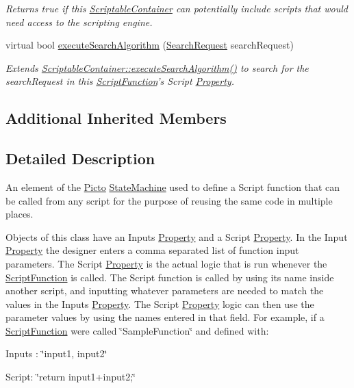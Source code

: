 \begin{DoxyCompactItemize}
\begin{DoxyCompactList}\small\item\em Returns true if this \hyperlink{class_picto_1_1_scriptable_container}{Scriptable\-Container} can potentially include scripts that would need access to the scripting engine. \end{DoxyCompactList}\item 
\hypertarget{class_picto_1_1_script_function_afcc5b2f699914d81ead2b54003bc4a85}{virtual bool \hyperlink{class_picto_1_1_script_function_afcc5b2f699914d81ead2b54003bc4a85}{execute\-Search\-Algorithm} (\hyperlink{struct_search_request}{Search\-Request} search\-Request)}\label{class_picto_1_1_script_function_afcc5b2f699914d81ead2b54003bc4a85}

\begin{DoxyCompactList}\small\item\em Extends \hyperlink{class_picto_1_1_scriptable_container_aae46c50e128e021f5ad66cb8b419c65a}{Scriptable\-Container\-::execute\-Search\-Algorithm()} to search for the search\-Request in this \hyperlink{class_picto_1_1_script_function}{Script\-Function}'s Script \hyperlink{class_picto_1_1_property}{Property}. \end{DoxyCompactList}\end{DoxyCompactItemize}
\subsection*{Additional Inherited Members}


\subsection{Detailed Description}
An element of the \hyperlink{namespace_picto}{Picto} \hyperlink{class_picto_1_1_state_machine}{State\-Machine} used to define a Script function that can be called from any script for the purpose of reusing the same code in multiple places. 

Objects of this class have an Inputs \hyperlink{class_picto_1_1_property}{Property} and a Script \hyperlink{class_picto_1_1_property}{Property}. In the Input \hyperlink{class_picto_1_1_property}{Property} the designer enters a comma separated list of function input parameters. The Script \hyperlink{class_picto_1_1_property}{Property} is the actual logic that is run whenever the \hyperlink{class_picto_1_1_script_function}{Script\-Function} is called. The Script function is called by using its name inside another script, and inputting whatever parameters are needed to match the values in the Inputs \hyperlink{class_picto_1_1_property}{Property}. The Script \hyperlink{class_picto_1_1_property}{Property} logic can then use the parameter values by using the names entered in that field. For example, if a \hyperlink{class_picto_1_1_script_function}{Script\-Function} were called \char`\"{}\-Sample\-Function\char`\"{} and defined with\-:
\begin{DoxyItemize}
\item Inputs \-: \char`\"{}input1, input2\char`\"{}
\item Script\-: \char`\"{}return input1+input2;\char`\"{}
\end{DoxyItemize}

